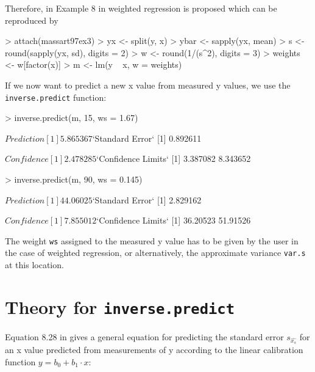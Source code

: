 \documentclass[a4paper]{article}
\begin{document}
Therefore, in Example 8 in \cite{massart97} weighted regression
is proposed which can be reproduced by

\begin{Schunk}
\begin{Sinput}
> attach(massart97ex3)
> yx <- split(y, x)
> ybar <- sapply(yx, mean)
> s <- round(sapply(yx, sd), digits = 2)
> w <- round(1/(s^2), digits = 3)
> weights <- w[factor(x)]
> m <- lm(y ~ x, w = weights)
\end{Sinput}
\end{Schunk}

If we now want to predict a new x value from measured y values,
we use the \texttt{inverse.predict} function:

\begin{Schunk}
\begin{Sinput}
> inverse.predict(m, 15, ws = 1.67)
\end{Sinput}
\begin{Soutput}
$Prediction
[1] 5.865367

$`Standard Error`
[1] 0.892611

$Confidence
[1] 2.478285

$`Confidence Limits`
[1] 3.387082 8.343652
\end{Soutput}
\begin{Sinput}
> inverse.predict(m, 90, ws = 0.145)
\end{Sinput}
\begin{Soutput}
$Prediction
[1] 44.06025

$`Standard Error`
[1] 2.829162

$Confidence
[1] 7.855012

$`Confidence Limits`
[1] 36.20523 51.91526
\end{Soutput}
\end{Schunk}

The weight \texttt{ws} assigned to the measured y value has to be 
given by the user in the case of weighted regression, or alternatively,
the approximate variance \texttt{var.s} at this location.

\section*{Theory for \texttt{inverse.predict}}
Equation 8.28 in \cite{massart97} gives a general equation for predicting the
standard error $s_{\hat{x_s}}$ for an x value predicted from measurements of y
according to the linear calibration function $ y = b_0 + b_1 \cdot x$:
\end{document}
